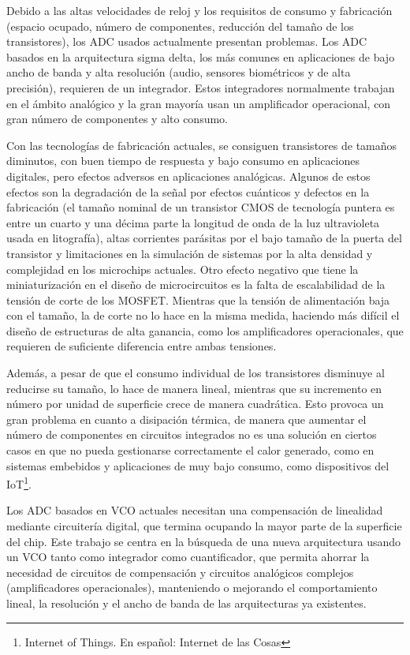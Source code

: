 \documentclass[12pt]{report} %
\begin{document}
	Debido a las altas velocidades de reloj y los requisitos de consumo y fabricación (espacio ocupado, número de componentes, reducción del tamaño de los transistores), los ADC usados actualmente presentan problemas. Los ADC basados en la arquitectura sigma delta, los más comunes en aplicaciones de bajo ancho de banda y alta resolución (audio, sensores biométricos y de alta precisión), requieren de un integrador. Estos integradores normalmente trabajan en el ámbito analógico y la gran mayoría usan un amplificador operacional, con gran número de componentes y alto consumo.
	
	Con las tecnologías de fabricación actuales, se consiguen transistores de tamaños diminutos, con buen tiempo de respuesta y bajo consumo en aplicaciones digitales, pero efectos adversos en aplicaciones analógicas.
	Algunos de estos efectos son la degradación de la señal por efectos cuánticos y defectos en la fabricación (el tamaño nominal de un transistor CMOS de tecnología puntera es entre un cuarto y una décima parte la longitud de onda de la luz ultravioleta usada en litografía), altas corrientes parásitas por el bajo tamaño de la puerta del transistor y limitaciones en la simulación de sistemas por la alta densidad y complejidad en los microchips actuales. Otro efecto negativo que tiene la miniaturización en el diseño de microcircuitos es la falta de escalabilidad de la tensión de corte de los MOSFET. Mientras que la tensión de alimentación baja con el tamaño, la de corte no lo hace en la misma medida, haciendo más difícil el diseño de estructuras de alta ganancia, como los amplificadores operacionales, que requieren de suficiente diferencia entre ambas tensiones.
	
	Además, a pesar de que el consumo individual de los transistores disminuye al reducirse su tamaño, lo hace de manera lineal, mientras que su incremento en número por unidad de superficie crece de manera cuadrática. Esto provoca un gran problema en cuanto a disipación térmica, de manera que aumentar el número de componentes en circuitos integrados no es una solución en ciertos casos en que no pueda gestionarse correctamente el calor generado, como en sistemas embebidos y aplicaciones de muy bajo consumo, como dispositivos del IoT\footnote{Internet of Things. En español: Internet de las Cosas}.
	
	Los ADC basados en VCO actuales necesitan una compensación de linealidad mediante circuitería digital, que termina ocupando la mayor parte de la superficie del chip. Este trabajo se centra en la búsqueda de una nueva arquitectura usando un VCO tanto como integrador como cuantificador, que permita ahorrar la necesidad de circuitos de compensación y circuitos analógicos complejos (amplificadores operacionales), manteniendo o mejorando el comportamiento lineal, la resolución y el ancho de banda de las arquitecturas ya existentes.
	
\end{document}
